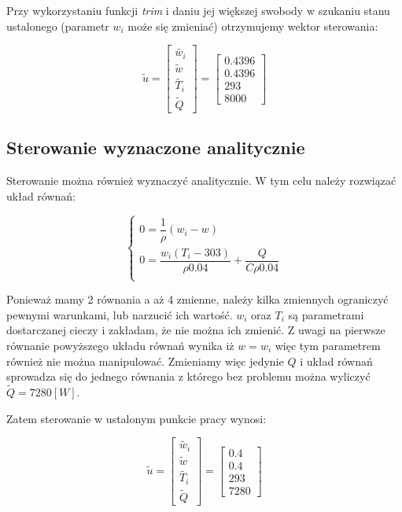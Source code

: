 \documentclass[12pt]{article}
\begin{document}
Przy wykorzystaniu funkcji \textit{trim} i daniu jej większej swobody w szukaniu
stanu ustalonego (parametr $w_i$ może się zmieniać) otrzymujemy wektor sterowania:

\begin{equation*}
	\tilde{u} =
	\begin{bmatrix}
		\tilde{w_i} \\
		\tilde{w} \\
		\tilde{T_i} \\
		\tilde{Q}
	\end{bmatrix} =
	\begin{bmatrix}
		0.4396 \\
		0.4396 \\
		293 \\
		8000
	\end{bmatrix}
\end{equation*}

\subsection{Sterowanie wyznaczone analitycznie}

Sterowanie można również wyznaczyć analitycznie. W tym celu należy rozwiązać
układ równań:

\begin{equation*}
	\begin{cases}
		0 = \dfrac{1}{\rho}(w_i-w) \\[0.3cm]
		0 = \dfrac{w_i(T_i-303)}{\rho 0.04} + \dfrac{Q}{C\rho 0.04} \\
	\end{cases}
\end{equation*}

Ponieważ mamy 2 równania a aż 4 zmienne, należy kilka zmiennych ograniczyć
pewnymi warunkami, lub narzucić ich wartość. $w_i$ oraz $T_i$ są parametrami
dostarczanej cieczy i zakładam, że nie można ich zmienić. Z uwagi na pierwsze
równanie powyższego układu równań wynika iż $w=w_i$ więc tym parametrem również nie można
manipulować. Zmieniamy więc jedynie $Q$ i układ równań sprowadza się do jednego
równania z którego bez problemu można wyliczyć $\tilde{Q}=7280[W]$.

Zatem sterowanie w ustalonym punkcie pracy wynosi:

\begin{equation*}
	\tilde{u} =
	\begin{bmatrix}
		\tilde{w_i} \\
		\tilde{w} \\
		\tilde{T_i} \\
		\tilde{Q}
	\end{bmatrix} =
	\begin{bmatrix}
		0.4 \\
		0.4 \\
		293 \\
		7280
	\end{bmatrix}
\end{equation*}
\end{document}
